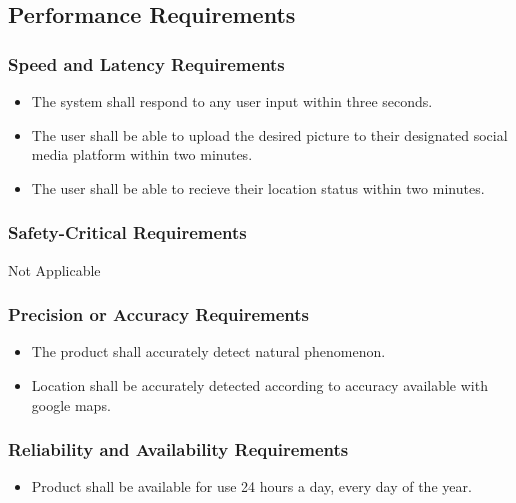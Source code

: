 \documentclass[]{article}
\begin{document}

\subsection{Performance Requirements}
\label{sub:performance_requirements}

\subsubsection{Speed and Latency Requirements}
\label{ssub:speed_and_latency_requirements}
\begin{itemize}
	\item The system shall respond to any user input within three seconds.
	\item The user shall be able to upload the desired picture to their designated social media platform within two minutes.
	\item The user shall be able to recieve their location status within two minutes.
\end{itemize}

\subsubsection{Safety-Critical Requirements}
\label{ssub:safety_critical_requirements}
Not Applicable

\subsubsection{Precision or Accuracy Requirements}
\label{ssub:precision_or_accuracy_requirements}
\begin{itemize}
	\item The product shall accurately detect natural phenomenon.
	\item Location shall be accurately detected according to accuracy available with google maps.
\end{itemize}

\subsubsection{Reliability and Availability Requirements}
\label{ssub:reliability_and_availability_requirements}
\begin{itemize}
	\item Product shall be available for use 24 hours a day, every day of the year.
\end{itemize}
\end{document}
